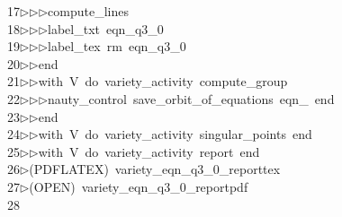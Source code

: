 \begin{tabbing}
17\>$\triangleright$\>$\triangleright$\>$\triangleright$\>compute\_lines\ \\[0pt]
18\>$\triangleright$\>$\triangleright$\>$\triangleright$\>label\_txt\ eqn\_q3\_0\ \\[0pt]
19\>$\triangleright$\>$\triangleright$\>$\triangleright$\>label\_tex\ rm\ eqn\_q3\_0\ \\[0pt]
20\>$\triangleright$\>$\triangleright$\>end\ \\[0pt]
21\>$\triangleright$\>$\triangleright$\>with\ V\ do\ variety\_activity\ compute\_group\ \\[0pt]
22\>$\triangleright$\>$\triangleright$\>$\triangleright$\>nauty\_control\ save\_orbit\_of\_equations\ eqn\_\ end\ \\[0pt]
23\>$\triangleright$\>$\triangleright$\>end\ \\[0pt]
24\>$\triangleright$\>$\triangleright$\>with\ V\ do\ variety\_activity\ singular\_points\ end\ \\[0pt]
25\>$\triangleright$\>$\triangleright$\>with\ V\ do\ variety\_activity\ report\ end\\[0pt]
26\>$\triangleright$\>(PDFLATEX)\ variety\_eqn\_q3\_0\_reporttex\\[0pt]
27\>$\triangleright$\>(OPEN)\ variety\_eqn\_q3\_0\_reportpdf\\[0pt]
28\>\end{tabbing}
